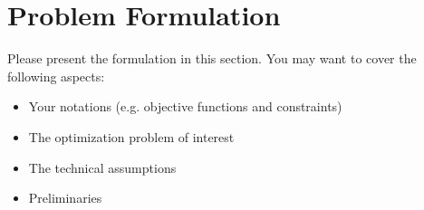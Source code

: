 \section{Problem Formulation}
\label{section:problem}
Please present the formulation in this section. You may want to cover the following aspects:
\begin{itemize}
    \item Your notations (e.g. objective functions and constraints)
    \item The optimization problem of interest
    \item The technical assumptions
    \item Preliminaries
\end{itemize}
